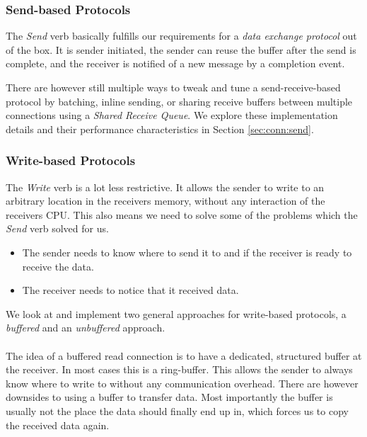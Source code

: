 \subsubsection{Send-based Protocols}
The \emph{Send} verb basically fulfills our requirements for a \emph{data exchange protocol} out of the box. It is sender
initiated, the sender can reuse the buffer after the send is complete, and the receiver is notified of a new message by
a completion event.

There are however still multiple ways to tweak and tune a send-receive-based protocol by batching, inline sending, or 
sharing receive buffers between multiple connections using a \emph{Shared Receive Queue}. We explore these implementation 
details and their performance characteristics in Section \ref{sec:conn:send}.

\subsubsection{Write-based Protocols}
The \emph{Write} verb is a lot less restrictive. It allows the sender to write to an arbitrary 
location in the receivers memory, without any interaction of the receivers CPU. This also means we need to solve some of the 
problems which the \emph{Send} verb solved for us.

\begin{itemize}
  \item The sender needs to know where to send it to and if the receiver is ready to receive the data.

  \item The receiver needs to notice that it received data.
\end{itemize}

We look at and implement two general approaches for write-based protocols, a \emph{buffered} and an \emph{unbuffered} approach.

\paragraph{} The idea of a buffered read connection is to have a dedicated, structured buffer at the receiver. In most cases 
this is a ring-buffer. This allows the sender to always know where to write to without any communication overhead. There 
are however downsides to using a buffer to transfer data. Most importantly the buffer is usually not the place the 
data should finally end up in, which forces us to copy the received data again.

